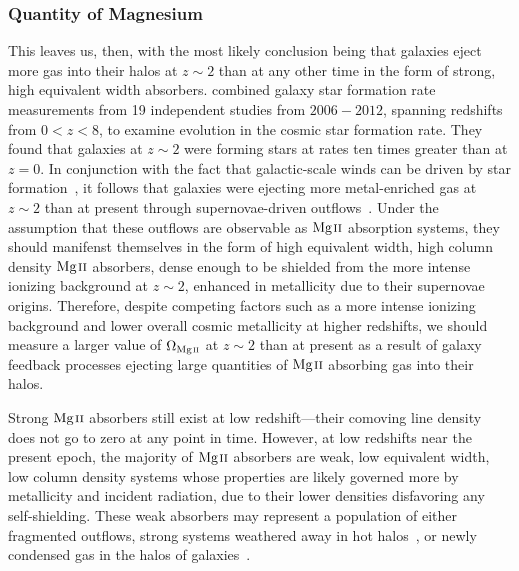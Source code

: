 \subsubsection{Quantity of Magnesium}
\label{ch5:quantities}

This leaves us, then, with the most likely conclusion being that galaxies eject more gas into their halos at $z \sim 2$ than at any other time in the form of strong, high equivalent width absorbers. \cite{Behroozi2013sfr} combined galaxy star formation rate measurements from 19 independent studies from $2006-2012$, spanning redshifts from $0 < z < 8$, to examine evolution in the cosmic star formation rate. They found that galaxies at $z \sim 2$ were forming stars at rates ten times greater than at $z = 0$. In conjunction with the fact that galactic-scale winds can be driven by star formation~\citep{Zhu2015}, it follows that galaxies were ejecting more metal-enriched gas at $z \sim 2$ than at present through supernovae-driven outflows~\citep{Sharma2013,Kacprzak2012-PA,Nestor2011}. Under the assumption that these outflows are observable as ${\hbox{{\rm Mg}\kern 0.1em{\sc ii}}}$ absorption systems, they should manifenst themselves in the form of high equivalent width, high column density ${\hbox{{\rm Mg}\kern 0.1em{\sc ii}}}$ absorbers, dense enough to be shielded from the more intense ionizing background at $z \sim 2$, enhanced in metallicity due to their supernovae origins. Therefore, despite competing factors such as a more intense ionizing background and lower overall cosmic metallicity at higher redshifts, we should measure a larger value of $\Omega_{\hbox{\scriptsize {\hbox{{\rm Mg}\kern 0.1em{\sc ii}}}}}$ at $z \sim 2$ than at present as a result of galaxy feedback processes ejecting large quantities of ${\hbox{{\rm Mg}\kern 0.1em{\sc ii}}}$ absorbing gas into their halos.

Strong ${\hbox{{\rm Mg}\kern 0.1em{\sc ii}}}$ absorbers still exist at low redshift---their comoving line density does not go to zero at any point in time. However, at low redshifts near the present epoch, the majority of ${\hbox{{\rm Mg}\kern 0.1em{\sc ii}}}$ absorbers are weak, low equivalent width, low column density systems whose properties are likely governed more by metallicity and incident radiation, due to their lower densities disfavoring any self-shielding. These weak absorbers may represent a population of either fragmented outflows, strong systems weathered away in hot halos~\citep{Sarkar2015}, or newly condensed gas in the halos of galaxies~\citep{Maller2004}.

